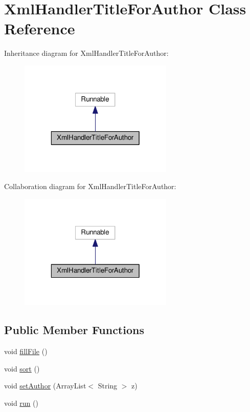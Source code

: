 \hypertarget{classXmlHandlerTitleForAuthor}{\section{Xml\-Handler\-Title\-For\-Author Class Reference}
\label{classXmlHandlerTitleForAuthor}
}


Inheritance diagram for Xml\-Handler\-Title\-For\-Author\-:
\nopagebreak
\begin{figure}[H]
\begin{center}
\leavevmode
\includegraphics[width=208pt]{classXmlHandlerTitleForAuthor__inherit__graph}
\end{center}
\end{figure}


Collaboration diagram for Xml\-Handler\-Title\-For\-Author\-:
\nopagebreak
\begin{figure}[H]
\begin{center}
\leavevmode
\includegraphics[width=208pt]{classXmlHandlerTitleForAuthor__coll__graph}
\end{center}
\end{figure}
\subsection*{Public Member Functions}
\begin{DoxyCompactItemize}
\item 
void \hyperlink{classXmlHandlerTitleForAuthor_af3adb501262a2822c56421f032877597}{fill\-File} ()
\item 
void \hyperlink{classXmlHandlerTitleForAuthor_ad366f324811314fadaf71266bab44d04}{sort} ()
\item 
void \hyperlink{classXmlHandlerTitleForAuthor_a97c8021ffd31638997b241891eb1c4ea}{set\-Author} (Array\-List$<$ String $>$ z)
\item 
void \hyperlink{classXmlHandlerTitleForAuthor_a8b6efd5dcc022fde5321b9ea8ba94215}{run} ()
\end{DoxyCompactItemize}
